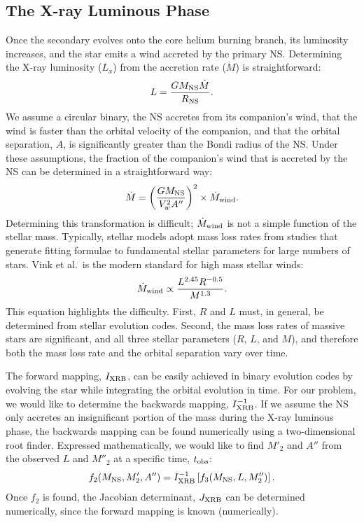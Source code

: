 \documentclass[12pt, preprint]{aastex}
\begin{document}
\subsection{The X-ray Luminous Phase}

Once the secondary evolves onto the core helium burning branch, its luminosity increases, and the star emits a wind accreted by the primary NS. Determining the X-ray luminosity ($L_x$) from the accretion rate ($\dot{M}$) is straightforward: 
\begin{equation}
L = \frac{G M_{\rm NS} \dot{M}}{R_{\rm NS}}.
\end{equation}
We assume a circular binary, the NS accretes from its companion's wind, that the wind is faster than the orbital velocity of the companion, and that the orbital separation, $A$, is significantly greater than the Bondi radius of the NS. Under these assumptions, the fraction of the companion's wind that is accreted by the NS can be determined in a straightforward way:
\begin{equation}
\dot{M} = \left( \frac{G M_{\rm NS}}{V_w^2 A''} \right)^2 \times \dot{M}_{\rm wind}.
\end{equation}
Determining this transformation is difficult; $\dot{M}_{\rm wind}$ is not a simple function of the stellar mass. Typically, stellar models adopt mass loss rates from studies that generate fitting formulae to fundamental stellar parameters for large numbers of stars. Vink et al.\ is the modern standard for high mass stellar winds:
\begin{equation}
\dot{M}_{\rm wind} \propto \frac{L^{2.45} R^{-0.5}}{M^{1.3}}. \label{eq:vink}
\end{equation}
This equation highlights the difficulty. First, $R$ and $L$ must, in general, be determined from stellar evolution codes. Second, the mass loss rates of massive stars are significant, and all three stellar parameters ($R$, $L$, and $M$), and therefore both the mass loss rate and the orbital separation vary over time. 

The forward mapping, $I_{\rm XRB}$, can be easily achieved in binary evolution codes by evolving the star while integrating the orbital evolution in time. For our problem, we would like to determine the backwards mapping, $I^{-1}_{\rm XRB}$. If we assume the NS only accretes an insignificant portion of the mass during the X-ray luminous phase, the backwards mapping can be found numerically using a two-dimensional root finder. Expressed mathematically, we would like to find $M'_2$ and $A''$ from the observed $L$ and $M''_2$ at a specific time, $t_{\rm obs}$:
\begin{equation}
f_2(M_{\rm NS}, M'_2, A'') = I^{-1}_{\rm XRB} \left[ f_3(M_{\rm NS}, L, M''_2) \right].
\end{equation}
Once $f_2$ is found, the Jacobian determinant, $J_{\rm XRB}$ can be determined numerically, since the forward mapping is known (numerically).
\end{document}
